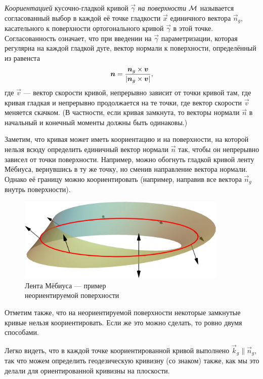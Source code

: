 \begin{definition}
	\textit{Коориентацией} кусочно-гладкой кривой $\vec{\gamma}$ \textit{на поверхности} $\mathcal{M}$ называется согласованный выбор в каждой её точке гладкости $\vec{x}$ единичного вектора $\vec{n}_g$, касательного к поверхности ортогонального кривой $\vec{\gamma}$ в этой точке. Согласованность означает, что при введении на $\vec{\gamma}$ параметризации, которая регулярна на каждой гладкой дуге, вектор нормали к поверхности, определённый из равенста
	\[
		\boldsymbol{n} = \frac{\boldsymbol{n}_g \times \boldsymbol{v}}{\left\lvert\boldsymbol{n}_g \times \boldsymbol{v}\right\rvert},
	\]
	где $\vec{v}$ --- вектор скорости кривой, непрерывно зависит от точки кривой там, где кривая гладкая и непрерывно продолжается на те точки, где вектор скорости $\vec{v}$ меняется скачком. (В частности, если кривая замкнута, то векторы нормали $\vec{n}$ в начальный и конечный моменты должны быть одинаковы.)
\end{definition}

Заметим, что кривая может иметь коориентацию и на поверхности, на которой нельзя всюду определить единичный вектор нормали $\vec{n}$ так, чтобы он непрерывно зависел от точки поверхности. Например, можно обогнуть гладкой кривой ленту Мёбиуса, вернувшись в ту же точку, но сменив направление вектора нормали. Однако её границу можно коориентировать (например, направив все вектора $\vec{n}_g$ внутрь поверхности).

\begin{figure}[H]
	\centering
	\includegraphics[width=10cm]{./img/MobiusStrip.pdf}
	\caption{Лента Мёбиуса --- пример\\ неориентируемой поверхности}
\end{figure} %

Отметим также, что на неориентируемой поверхности некоторые замкнутые кривые нельзя коориентировать. Если же это можно сделать, то ровно двумя способами.

Легко видеть, что в каждой точке коориентированной кривой выполнено $\vec{k}_g \parallel \vec{n}_g$, так что можем определить геодезическую кривизну (со знаком) также, как мы это делали для ориентированной кривизны на плоскости.

